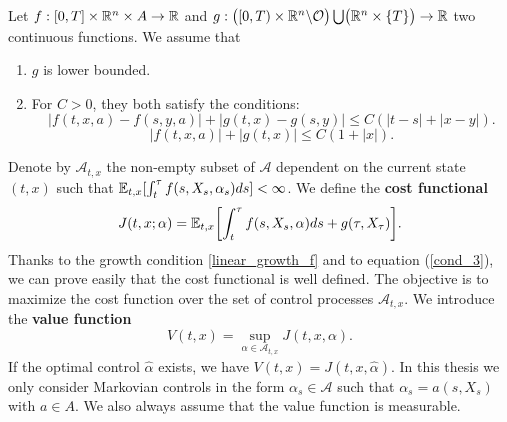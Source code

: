 \noindent
Let $f:[0,T]\times \mathbb{R}^n \times A \to \mathbb{R}$ and $g: \bigl( [0,T)\times \mathbb{R}^n \backslash \mathcal{O} \bigr) \bigcup \bigl( \mathbb{R}^n \times \{T\} \bigr) \to \mathbb{R}$ two continuous functions. 
We assume that
\begin{enumerate}
 \item $g$ is lower bounded.
 \item For $C > 0$, they both satisfy the conditions:
 \begin{equation}\label{Lipschitz_f}
  |f(t,x,a) - f(s,y,a)| + |g(t,x)-g(s,y)| \leq C (|t-s|+|x-y|).
 \end{equation}
 \begin{equation}\label{linear_growth_f}
  |f(t,x,a)| + |g(t,x)| \leq C (1+|x|).
 \end{equation}
\end{enumerate}
Denote by $\mathcal{A}_{t,x}$ the non-empty subset of $\mathcal{A}$ dependent on the current state $(t,x)$ such that $\mathbb{E}_{t,x} [\int_{t}^{\tau} f(s,X_s,\alpha_s) ds] < \infty $. 
We define the \textbf{cost functional}
\begin{equation}\label{cost_functional}
 J(t,x;\alpha) = \mathbb{E}_{t,x} \biggl[ \int_t^{\tau} f(s,X_s,\alpha) ds + g(\tau, X_{\tau}) \biggr] . 
\end{equation}
Thanks to the growth condition \ref{linear_growth_f} and to equation (\ref{cond_3}), we can prove easily that the cost functional is well defined. 
The objective is to maximize the cost function over the set of control processes $\mathcal{A}_{t,x}$. We introduce the \textbf{value function}
\begin{equation}\label{general_value_function}
 V(t,x) = \sup_{\alpha \in \mathcal{A}_{t,x}} J(t,x,\alpha).
\end{equation}
If the optimal control $\hat \alpha$ exists, we have $V(t,x) = J(t,x,\hat \alpha)$.
In this thesis we only consider Markovian controls in the form $\alpha_s \in \mathcal{A}$ such that $\alpha_s = a(s,X_s)$ with $a \in A$. We also always assume that the value function is 
measurable.
\newline

